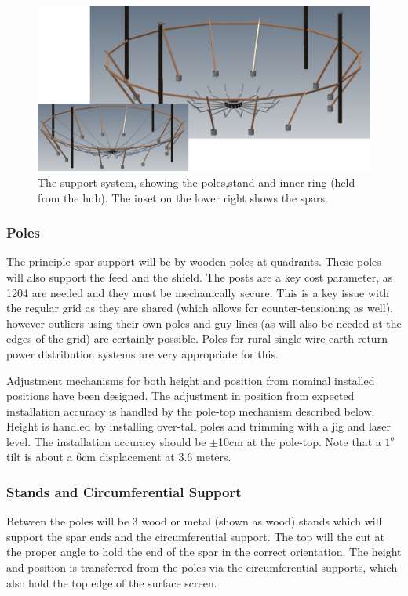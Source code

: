 \documentclass[11pt]{article}
\begin{document}
\begin{figure}[H]
\centering
\includegraphics[width=\textwidth]{plots/support.png}
\caption{The support system, showing the poles,stand and inner ring (held from the hub).  The inset on the lower right shows the spars.}
\label{fig:support}
\end{figure}

\subsubsection{Poles}
The principle spar support will be by wooden poles at quadrants.  These poles will also support the feed and the shield.  The posts are a key cost parameter, as 1204 are needed and they must be mechanically secure.  This is a key issue with the regular grid as they are shared (which allows for counter-tensioning as well), however outliers using their own poles and guy-lines (as will also be needed at the edges of the grid) are certainly possible.   Poles for rural single-wire earth return power distribution systems are very appropriate for this.

Adjustment mechanisms for both height and position from nominal installed positions have been designed.  The adjustment in position from expected installation accuracy is handled by the pole-top mechanism described below.  Height is handled by installing over-tall poles and trimming with a jig and laser level.  The installation accuracy should be $\pm$10cm at the pole-top.  Note that a $1^o$ tilt is about a 6cm displacement at 3.6 meters.

\subsubsection{Stands and Circumferential Support}
Between the poles will be 3 wood or metal (shown as wood) stands which will support the spar ends and the circumferential support.  The top will the cut at the proper angle to hold the end of the spar in the correct orientation.  The height and position is transferred from the poles via the circumferential supports, which also hold the top edge of the surface screen.
\end{document}
